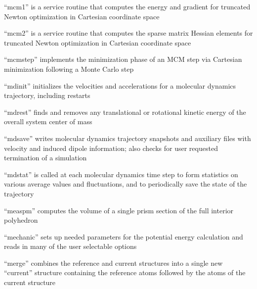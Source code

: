 \documentclass[letterpaper,11pt,english]{sphinxmanual}
\begin{document}
“mcm1” is a service routine that computes the energy and gradient for truncated Newton optimization in Cartesian coordinate space


“mcm2” is a service routine that computes the sparse matrix Hessian elements for truncated Newton optimization in Cartesian coordinate space


“mcmstep” implements the minimization phase of an MCM step via Cartesian minimization following a Monte Carlo step


“mdinit” initializes the velocities and accelerations for a molecular dynamics trajectory, including restarts


“mdrest” finds and removes any translational or rotational kinetic energy of the overall system center of mass


“mdsave” writes molecular dynamics trajectory snapshots and auxiliary files with velocity and induced dipole information; also checks for user requested termination of a simulation


“mdstat” is called at each molecular dynamics time step to form statistics on various average values and fluctuations, and to periodically save the state of the trajectory





“measpm” computes the volume of a single prism section of the full interior polyhedron


“mechanic” sets up needed parameters for the potential energy calculation and reads in many of the user selectable options


“merge” combines the reference and current structures into a single new “current” structure containing the reference atoms followed by the atoms of the current structure
\end{document}
